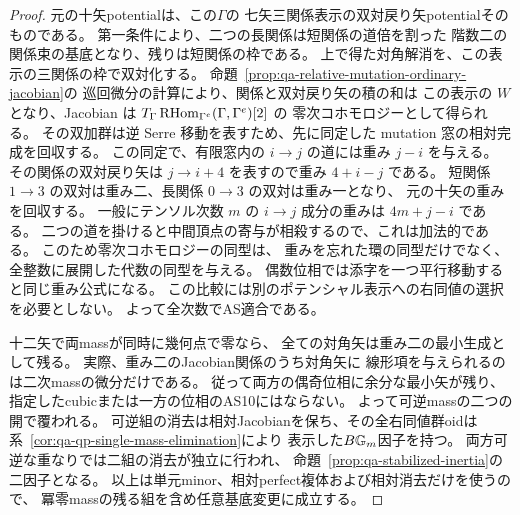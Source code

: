 \begin{proof}
元の十矢potentialは、この$\Gamma$の
七矢三関係表示の双対戻り矢potentialそのものである。
第一条件により、二つの長関係は短関係の道倍を割った
階数二の関係束の基底となり、残りは短関係の枠である。
上で得た対角解消を、この表示の三関係の枠で双対化する。
命題~\ref{prop:qa-relative-mutation-ordinary-jacobian}の
巡回微分の計算により、関係と双対戻り矢の積の和は
この表示の $W$ となり、Jacobian は
$T_\Gamma\operatorname{RHom}_{\Gamma^e}(\Gamma,\Gamma^e)[2]$ の
零次コホモロジーとして得られる。
その双加群は逆 Serre 移動を表すため、先に同定した
mutation 窓の相対完成を回収する。
この同定で、有限窓内の $i\to j$ の道には重み $j-i$ を与える。
その関係の双対戻り矢は $j\to i+4$ を表すので重み $4+i-j$ である。
短関係 $1\to3$ の双対は重み二、長関係 $0\to3$ の双対は重み一となり、
元の十矢の重みを回収する。
一般にテンソル次数 $m$ の $i\to j$ 成分の重みは $4m+j-i$ である。
二つの道を掛けると中間頂点の寄与が相殺するので、これは加法的である。
このため零次コホモロジーの同型は、
重みを忘れた環の同型だけでなく、全整数に展開した代数の同型を与える。
偶数位相では添字を一つ平行移動すると同じ重み公式になる。
この比較には別のポテンシャル表示への右同値の選択を必要としない。
よって全次数でAS適合である。

十二矢で両massが同時に幾何点で零なら、
全ての対角矢は重み二の最小生成として残る。
実際、重み二のJacobian関係のうち対角矢に
線形項を与えられるのは二次massの微分だけである。
従って両方の偶奇位相に余分な最小矢が残り、
指定したcubicまたは一方の位相のAS10にはならない。
よって可逆massの二つの開で覆われる。
可逆組の消去は相対Jacobianを保ち、その全右同値群oidは
系~\ref{cor:qa-qp-single-mass-elimination}により
表示した$B\mathbb G_m$因子を持つ。
両方可逆な重なりでは二組の消去が独立に行われ、
命題~\ref{prop:qa-stabilized-inertia}の二因子となる。
以上は単元minor、相対perfect複体および相対消去だけを使うので、
冪零massの残る組を含め任意基底変更に成立する。
\end{proof}

